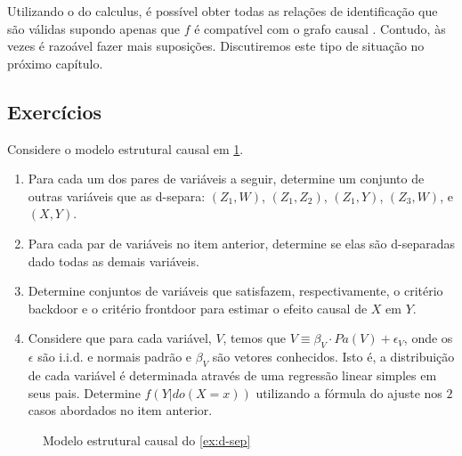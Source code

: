Utilizando o do calculus,
é possível obter todas 
as relações de identificação que
são válidas supondo apenas que
$f$ é compatível com 
o grafo causal \citep{Shpitser2006,Shpitser2008}.
Contudo, às vezes é razoável fazer 
mais suposições.
Discutiremos este tipo de situação
no próximo capítulo.

\subsection{Exercícios}

\begin{exercise}
 \label{ex:d-sep}
 Considere o modelo estrutural causal
 em \cref{fig:d-sep}.
 \begin{enumerate}[label=(\alph*)]
  \item Para cada um dos pares de variáveis a seguir,
  determine um conjunto de outras variáveis que
  as d-separa: $(Z_1,W)$, $(Z_1,Z_2)$, $(Z_1,Y)$, 
  $(Z_3,W)$, e $(X,Y)$.
  \item Para cada par de variáveis no item anterior,
  determine se elas são d-separadas dado
  todas as demais variáveis.
  \item Determine conjuntos de variáveis que
  satisfazem, respectivamente, 
  o critério backdoor e 
  o critério frontdoor para
  estimar o efeito causal de $X$ em $Y$.
  \item Considere que para cada variável, $V$, temos que
  $V \equiv \beta_V \cdot Pa(V) + \epsilon_V$,
  onde os $\epsilon$ são i.i.d. e normais padrão e
  $\beta_V$ são vetores conhecidos. Isto é,
  a distribuição de cada variável é 
  determinada através de 
  uma regressão linear simples em seus pais.
  Determine $f(Y|do(X=x))$ utilizando a fórmula do ajuste
  nos $2$ casos abordados no item anterior.
 \end{enumerate}
\begin{figure}
 \centering
 \caption{Modelo estrutural causal do \cref{ex:d-sep}}
 \label{fig:d-sep}
\end{figure}
\end{exercise}


